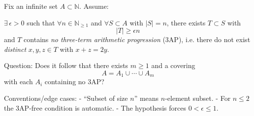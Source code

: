 Fix an infinite set $A\subset\mathbb{N}$. Assume:

$\exists\,\epsilon>0$ such that $\forall n\in\mathbb{N}_{\ge 1}$ and $\forall S\subset A$ with $|S|=n$, there exists $T\subset S$ with
\[
|T|\ge \epsilon n
\]
and $T$ contains \emph{no three-term arithmetic progression} (3AP), i.e. there do not exist \emph{distinct} $x,y,z\in T$ with $x+z=2y$.

Question: Does it follow that there exists $m\ge 1$ and a covering
\[
A = A_1\cup\cdots\cup A_m
\]
with each $A_i$ containing no 3AP?

Conventions/edge cases:
- “Subset of size $n$” means $n$-element subset.
- For $n\le 2$ the 3AP-free condition is automatic.
- The hypothesis forces $0<\epsilon\le 1$.
